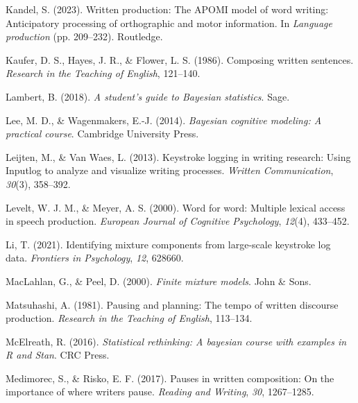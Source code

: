 \documentclass[
  man,floatsintext]{apa7}
\newlength{\cslhangindent}
\newlength{\cslentryspacingunit} %
\newenvironment{CSLReferences}[2] %
 {%
  \setlength{\parindent}{0pt}
  \ifodd #1
  \let\oldpar\par
  \def\par{\hangindent=\cslhangindent\oldpar}
  \fi
  \setlength{\parskip}{#2\cslentryspacingunit}
 }%
 {}
\begin{document}
\begin{CSLReferences}{1}{0}
\leavevmode{}%
Kandel, S. (2023). Written production: The {APOMI} model of word writing: Anticipatory processing of orthographic and motor information. In \emph{Language production} (pp. 209--232). Routledge.

\leavevmode{}%
Kaufer, D. S., Hayes, J. R., \& Flower, L. S. (1986). Composing written sentences. \emph{Research in the Teaching of English}, 121--140.

\leavevmode{}%
Lambert, B. (2018). \emph{A student's guide to {B}ayesian statistics}. Sage.

\leavevmode{}%
Lee, M. D., \& Wagenmakers, E.-J. (2014). \emph{Bayesian cognitive modeling: A practical course}. Cambridge University Press.

\leavevmode{}%
Leijten, M., \& Van Waes, L. (2013). Keystroke logging in writing research: Using {Inputlog} to analyze and visualize writing processes. \emph{Written Communication}, \emph{30}(3), 358--392.

\leavevmode{}%
Levelt, W. J. M., \& Meyer, A. S. (2000). Word for word: Multiple lexical access in speech production. \emph{European Journal of Cognitive Psychology}, \emph{12}(4), 433--452.

\leavevmode{}%
Li, T. (2021). Identifying mixture components from large-scale keystroke log data. \emph{Frontiers in Psychology}, \emph{12}, 628660.

\leavevmode{}%
MacLahlan, G., \& Peel, D. (2000). \emph{Finite mixture models}. John \& Sons.

\leavevmode{}%
Matsuhashi, A. (1981). Pausing and planning: The tempo of written discourse production. \emph{Research in the Teaching of English}, 113--134.

\leavevmode{}%
McElreath, R. (2016). \emph{Statistical rethinking: {A} bayesian course with examples in {R} and {Stan}}. CRC Press.

\leavevmode{}%
Medimorec, S., \& Risko, E. F. (2017). Pauses in written composition: On the importance of where writers pause. \emph{Reading and Writing}, \emph{30}, 1267--1285.


\end{CSLReferences}
\end{document}
